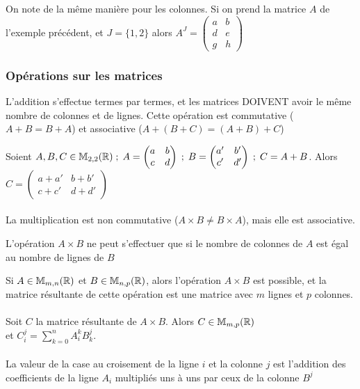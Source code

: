 \documentclass[a4paper, 11pt]{article}
\begin{document}
On note de la même manière pour les colonnes.
Si on prend la matrice $A$ de l'exemple précédent, et $J = \{1, 2\}$ alors $A^{J} = \begin{pmatrix}a&b\\d&e\\g&h\end{pmatrix}$

\newpage
\subsubsection{Opérations sur les matrices}

L'addition s'effectue termes par termes, et les matrices DOIVENT avoir le même nombre de colonnes et de lignes.
Cette opération est commutative ($A + B = B + A$) et associative ($A + (B + C) = (A + B) + C$)

Soient $A, B, C \in \mathbb{M}_{2,2}(\mathbb{R}) \; ; \; A = \begin{pmatrix}a&b\\c&d\end{pmatrix} \; ; \; B =
\begin{pmatrix}a'&b'\\c'&d'\end{pmatrix} \; ; \; C = A + B$.
Alors $C = \begin{pmatrix}a+a'&b+b'\\c+c'&d+d'\end{pmatrix}$ \\ \\

La multiplication est non commutative ($A \times B \ne B \times A$), mais elle est associative.

L'opération $A \times B$ ne peut s'effectuer que si le nombre de colonnes de $A$ est égal au nombre de lignes de $B$

Si $A \in \mathbb{M}_{m,n}(\mathbb{R})$ et $B \in \mathbb{M}_{n,p}(\mathbb{R})$, alors l'opération $A \times B$ est possible, et la matrice résultante
de cette opération est une matrice avec $m$ lignes et $p$ colonnes. \\ \\

Soit $C$ la matrice résultante de $A \times B$. Alors $C \in \mathbb{M}_{m,p}(\mathbb{R})$ \\
et $C_{i}^{j} = \sum_{k = 0}^{n} A_{i}^{k} B_{k}^{j}$. \\ \\

La valeur de la case au croisement de la ligne $i$ et la colonne $j$ est l'addition des coefficients de la ligne $A_i$
multipliés uns à uns par ceux de la colonne $B^{j}$
\end{document}
